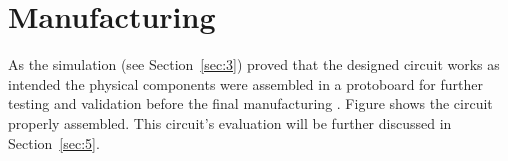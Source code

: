 \section{\textbf{Manufacturing}}\label{sec:4}
	As the simulation (see Section~\ref{sec:3}) proved that the designed circuit works as intended the physical components were assembled in a protoboard for further testing and validation before the final manufacturing . Figure shows the circuit properly assembled. This circuit's evaluation will be further discussed in Section~\ref{sec:5}.
	
	